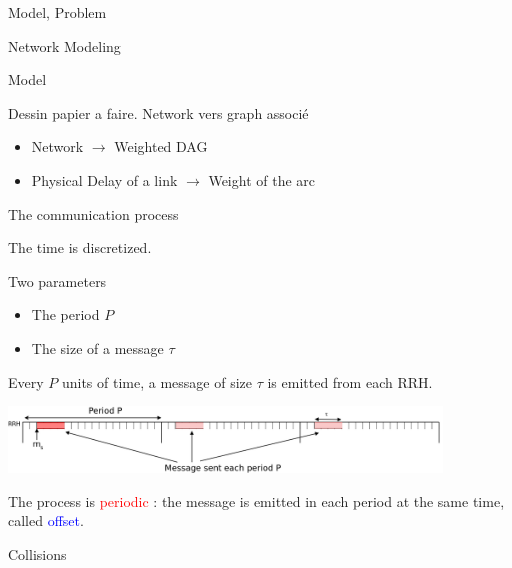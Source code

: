 \documentclass[10 pt]{beamer}
\begin{document}
\begin{section}{Model, Problem}

\begin{subsection}{Network Modeling}

\begin{frame}{Model}

Dessin papier a faire.
Network vers graph associé
\begin{itemize}
\item Network $\rightarrow$ Weighted DAG
\item  Physical Delay of a link $\rightarrow$ Weight of the arc
\end{itemize}

 \end{frame}
 
 
 
 \begin{frame}{The communication process}
 
 The time is discretized.

Two parameters
\begin{itemize}
\item The period $P$
\item The size of a message $\tau$
\end{itemize}
\vspace{0.5cm}

Every $P$ units of time, a message of size $\tau$ is emitted from each RRH.

\vspace{0.5cm}
\begin{center}
  \includegraphics [width=11.5cm]{rrh} 
  \end{center}
 \vspace{0.5cm}
   
   The process is \textcolor{red}{periodic} : the message is emitted in each period at the same time, called \textcolor{blue}{offset}.
   
\end{frame}


 \begin{frame}{Collisions}

\begin{center}
\end{center}
\end{frame}
\end{subsection}
\end{section}
\end{document}
